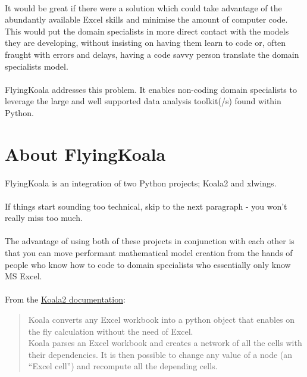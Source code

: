 \documentclass[12pt,a4paper,twoside,openright,titlepage]{article}
\begin{document}
\paragraph{} It would be great if there were a solution which could take advantage of the abundantly available Excel skills and minimise the amount of computer code. This would put the domain specialists in more direct contact with the models they are developing, without insisting on having them learn to code or, often fraught with errors and delays, having a code savvy person translate the domain specialists model.

\paragraph{} FlyingKoala addresses this problem. It enables non-coding domain specialists to leverage the large and well supported data analysis toolkit(/s) found within Python.

\section{About FlyingKoala}

\paragraph{} FlyingKoala is an integration of two Python projects; Koala2 and xlwings.

\paragraph{} If things start sounding too technical, skip to the next paragraph - you won't really miss too much.

\paragraph{} The advantage of using both of these projects in conjunction with each other is that you can move performant mathematical model creation from the hands of people who know how to code to domain specialists who essentially only know MS Excel.

\paragraph{} From the \href{https://github.com/anthill/koala}{Koala2 documentation}:

\begin{quotation}
Koala converts any Excel workbook into a python object that enables on the fly calculation without the need of Excel.\\

Koala parses an Excel workbook and creates a network of all the cells with their dependencies. It is then possible to change any value of a node (an ``Excel cell'') and recompute all the depending cells.
\end{quotation}
\end{document}
